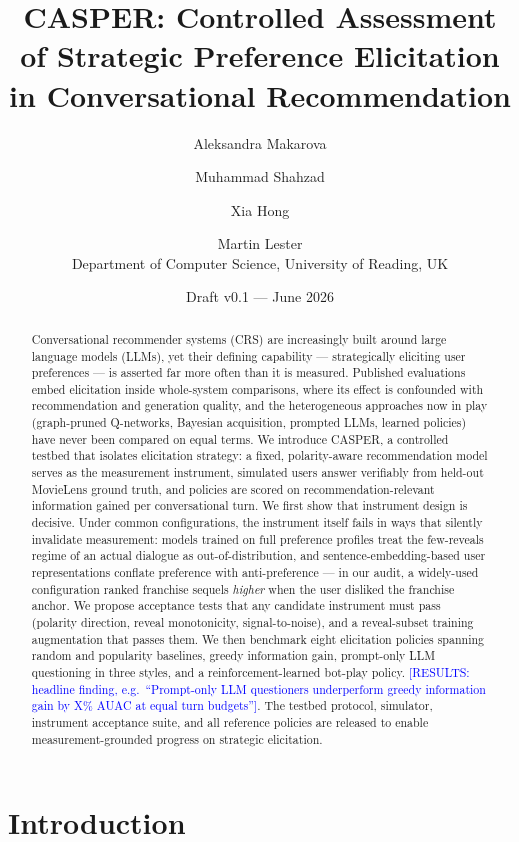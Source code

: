 \documentclass[11pt]{article}
\title{CASPER: Controlled Assessment of Strategic Preference Elicitation
in Conversational Recommendation}
\author{Aleksandra Makarova \and Muhammad Shahzad \and Xia Hong \and Martin Lester\\
\small Department of Computer Science, University of Reading, UK}
\date{Draft v0.1 --- June 2026}
\newcommand{\results}[1]{\textcolor{blue}{[RESULTS: #1]}}
\begin{document}
\maketitle

\begin{abstract}
Conversational recommender systems (CRS) are increasingly built around large
language models (LLMs), yet their defining capability --- strategically
eliciting user preferences --- is asserted far more often than it is
measured. Published evaluations embed elicitation inside whole-system
comparisons, where its effect is confounded with recommendation and
generation quality, and the heterogeneous approaches now in play
(graph-pruned Q-networks, Bayesian acquisition, prompted LLMs, learned
policies) have never been compared on equal terms. We introduce CASPER, a
controlled testbed that isolates elicitation strategy: a fixed,
polarity-aware recommendation model serves as the measurement instrument,
simulated users answer verifiably from held-out MovieLens ground truth, and
policies are scored on recommendation-relevant information gained per
conversational turn. We first show that instrument design is decisive.
Under common configurations, the instrument itself fails in ways that
silently invalidate measurement: models trained on full preference profiles
treat the few-reveals regime of an actual dialogue as out-of-distribution,
and sentence-embedding-based user representations conflate preference with
anti-preference --- in our audit, a widely-used configuration ranked
franchise sequels \emph{higher} when the user disliked the franchise anchor.
We propose acceptance tests that any candidate instrument must pass
(polarity direction, reveal monotonicity, signal-to-noise), and a
reveal-subset training augmentation that passes them. We then benchmark
eight elicitation policies spanning random and popularity baselines, greedy
information gain, prompt-only LLM questioning in three styles, and a
reinforcement-learned bot-play policy. \results{headline finding, e.g.\
``Prompt-only LLM questioners underperform greedy information gain by X\%
AUAC at equal turn budgets''}. The testbed protocol, simulator, instrument
acceptance suite, and all reference policies are released to enable
measurement-grounded progress on strategic elicitation.
\end{abstract}

\section{Introduction}
\label{sec:intro}
\end{document}
